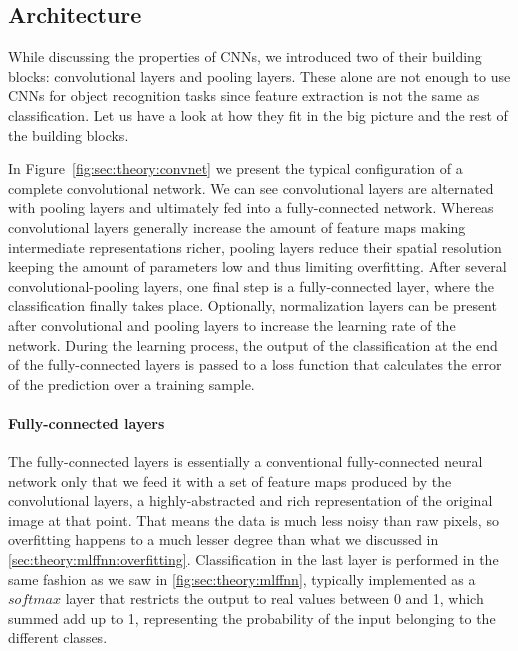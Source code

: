 \subsection{Architecture}
\label{sub:theory:convnets:achitecture}

While discussing the properties of CNNs, we introduced two of their building blocks: convolutional layers and pooling layers.
These alone are not enough to use CNNs for object recognition tasks since feature extraction is not the same as classification.
Let us have a look at how they fit in the big picture and the rest of the building blocks.

In Figure~\ref{fig:sec:theory:convnet} we present the typical configuration of a complete convolutional network.
We can see convolutional layers are alternated with pooling layers and ultimately fed into a fully-connected network.
Whereas convolutional layers generally increase the amount of feature maps making intermediate representations richer, pooling layers reduce their spatial resolution keeping the amount of parameters low and thus limiting overfitting.
After several convolutional-pooling layers, one final step is a fully-connected layer, where the classification finally takes place.
Optionally, normalization layers can be present after convolutional and pooling layers to increase the learning rate of the network.
During the learning process, the output of the classification at the end of the fully-connected layers is passed to a loss function that calculates the error of the prediction over a training sample.

\paragraph{Fully-connected layers}
The fully-connected layers is essentially a conventional fully-connected neural network only that we feed it with a set of feature maps produced by the convolutional layers, a highly-abstracted and rich representation of the original image at that point.
That means the data is much less noisy than raw pixels, so overfitting happens to a much lesser degree than what we discussed in \autoref{sec:theory:mlffnn:overfitting}.
Classification in the last layer is performed in the same fashion as we saw in \autoref{fig:sec:theory:mlffnn}, typically implemented as a $softmax$ layer that restricts the output to real values between 0 and 1, which summed add up to 1, representing the probability of the input belonging to the different classes.

